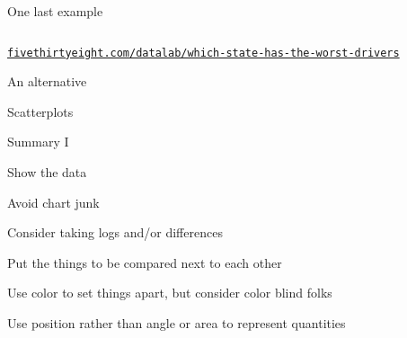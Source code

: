 \documentclass[aspectratio=169,12pt,t]{beamer}
\begin{document}
\begin{frame}{One last example}

\begin{columns}









\end{columns}

\vspace{12pt}
\hfill \footnotesize \lolit
\href{https://fivethirtyeight.com/datalab/which-state-has-the-worst-drivers/}{\tt fivethirtyeight.com/datalab/which-state-has-the-worst-drivers}

\note{
}
\end{frame}


\begin{frame}[c]{An alternative}


\note{
}
\end{frame}

\begin{frame}[c]{Scatterplots}


\note{
}
\end{frame}



\begin{frame}{Summary I}

\bbi
\item Show the data

\item Avoid chart junk

\item Consider taking logs and/or differences

\item Put the things to be compared next to each other

\item Use color to set things apart, but consider color blind folks

\item Use position rather than angle or area to represent quantities
\ei

\note{
}
\end{frame}
\end{document}
